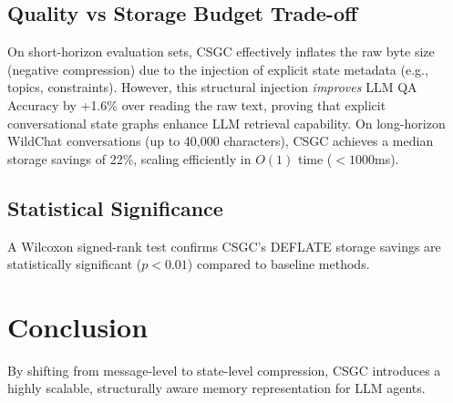 \documentclass[10pt,twocolumn,letterpaper]{article}
\begin{document}
\subsection{Quality vs Storage Budget Trade-off}
On short-horizon evaluation sets, CSGC effectively inflates the raw byte size (negative compression) due to the injection of explicit state metadata (e.g., topics, constraints). However, this structural injection \textit{improves} LLM QA Accuracy by +1.6\% over reading the raw text, proving that explicit conversational state graphs enhance LLM retrieval capability. On long-horizon WildChat conversations (up to 40,000 characters), CSGC achieves a median storage savings of 22\%, scaling efficiently in $O(1)$ time ($<1000$ms).

\subsection{Statistical Significance}
A Wilcoxon signed-rank test confirms CSGC's DEFLATE storage savings are statistically significant ($p < 0.01$) compared to baseline methods.

\section{Conclusion}
By shifting from message-level to state-level compression, CSGC introduces a highly scalable, structurally aware memory representation for LLM agents.

{\small


}
\end{document}
